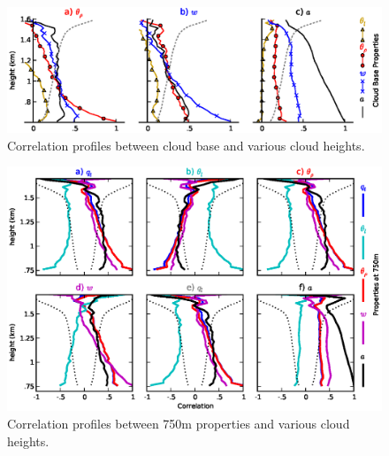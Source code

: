\documentclass[acp]{copernicus}
\begin{document}
\begin{figure}[t]
\vspace*{2mm}
\begin{center}
\includegraphics[width=\textwidth]{./figures/cloud_base_profiles}
\end{center}
\caption{Correlation profiles between cloud base and various cloud heights.}
\label{fig:cloud_base_profiles}
\end{figure}

\begin{figure}[t]
\vspace*{2mm}
\begin{center}
\includegraphics[width=\textwidth]{./figures/750m_profiles}
\end{center}
\caption{Correlation profiles between 750m properties and various cloud heights.}
\label{fig:750m_profiles}
\end{figure}





\end{document}
